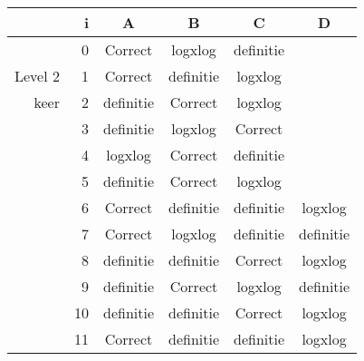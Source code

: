\begin{tabular}{ rr| c|c|c|c}\hline\hline
     & i & \textbf{A} & \textbf{B} & \textbf{C} & \textbf{D}\\\hline

&0&Correct\cellcolor[gray]{0.6}&logxlog&definitie\\
Level 2 & 1&Correct\cellcolor[gray]{0.6}&definitie&logxlog\\
keer &2&definitie&Correct\cellcolor[gray]{0.6}&logxlog\\
&3&definitie&logxlog&Correct\cellcolor[gray]{0.6}\\
&4&logxlog&Correct\cellcolor[gray]{0.6}&definitie\\
&5&definitie&Correct\cellcolor[gray]{0.6}&logxlog\\
&6&Correct\cellcolor[gray]{0.6}&definitie&definitie&logxlog\\
&7&Correct\cellcolor[gray]{0.6}&logxlog&definitie&definitie\\
&8&definitie&definitie&Correct\cellcolor[gray]{0.6}&logxlog\\
&9&definitie&Correct\cellcolor[gray]{0.6}&logxlog&definitie\\
&10&definitie&definitie&Correct\cellcolor[gray]{0.6}&logxlog\\
&11&Correct\cellcolor[gray]{0.6}&definitie&definitie&logxlog\\
\hline\end{tabular}\par\ \newline

